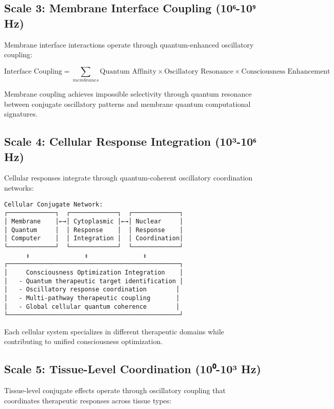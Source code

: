 \documentclass[12pt,a4paper]{article}
\begin{document}
\subsection{Scale 3: Membrane Interface Coupling (10⁶-10⁹ Hz)}

Membrane interface interactions operate through quantum-enhanced oscillatory coupling:

\begin{equation}
\text{Interface Coupling} = \sum_{membranes} \text{Quantum Affinity} \times \text{Oscillatory Resonance} \times \text{Consciousness Enhancement}
\end{equation}

Membrane coupling achieves impossible selectivity through quantum resonance between conjugate oscillatory patterns and membrane quantum computational signatures.

\subsection{Scale 4: Cellular Response Integration (10³-10⁶ Hz)}

Cellular responses integrate through quantum-coherent oscillatory coordination networks:

\begin{verbatim}
Cellular Conjugate Network:
┌─────────────┐  ┌─────────────┐  ┌─────────────┐
│ Membrane    │←→│ Cytoplasmic │←→│ Nuclear     │
│ Quantum     │  │ Response    │  │ Response    │
│ Computer    │  │ Integration │  │ Coordination│
└─────────────┘  └─────────────┘  └─────────────┘
      ↕               ↕               ↕
┌───────────────────────────────────────────────┐
│     Consciousness Optimization Integration    │
│   - Quantum therapeutic target identification │
│   - Oscillatory response coordination        │
│   - Multi-pathway therapeutic coupling       │
│   - Global cellular quantum coherence        │
└───────────────────────────────────────────────┘
\end{verbatim}

Each cellular system specializes in different therapeutic domains while contributing to unified consciousness optimization.

\subsection{Scale 5: Tissue-Level Coordination (10⁰-10³ Hz)}

Tissue-level conjugate effects operate through oscillatory coupling that coordinates therapeutic responses across tissue types:
\end{document}

